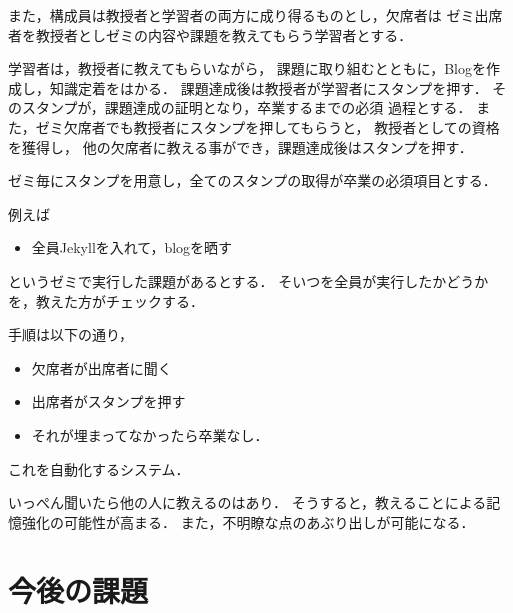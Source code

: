 \documentclass{hissymp}
\begin{document}
また，構成員は教授者と学習者の両方に成り得るものとし，欠席者は
ゼミ出席者を教授者としゼミの内容や課題を教えてもらう学習者とする．

学習者は，教授者に教えてもらいながら，
課題に取り組むとともに，Blogを作成し，知識定着をはかる．
課題達成後は教授者が学習者にスタンプを押す．
そのスタンプが，課題達成の証明となり，卒業するまでの必須
過程とする．
また，ゼミ欠席者でも教授者にスタンプを押してもらうと，
教授者としての資格を獲得し，
他の欠席者に教える事ができ，課題達成後はスタンプを押す．

ゼミ毎にスタンプを用意し，全てのスタンプの取得が卒業の必須項目とする．

例えば
\begin{itemize}
\item 全員Jekyllを入れて，blogを晒す
\end{itemize}
というゼミで実行した課題があるとする．
そいつを全員が実行したかどうかを，教えた方がチェックする．

手順は以下の通り，
\begin{itemize}
\item 欠席者が出席者に聞く
\item 出席者がスタンプを押す
\item それが埋まってなかったら卒業なし．
\end{itemize}
これを自動化するシステム．

いっぺん聞いたら他の人に教えるのはあり．
そうすると，教えることによる記憶強化の可能性が高まる．
また，不明瞭な点のあぶり出しが可能になる．

\section{今後の課題}
\label{sec:orgc1a886a}
\end{document}
